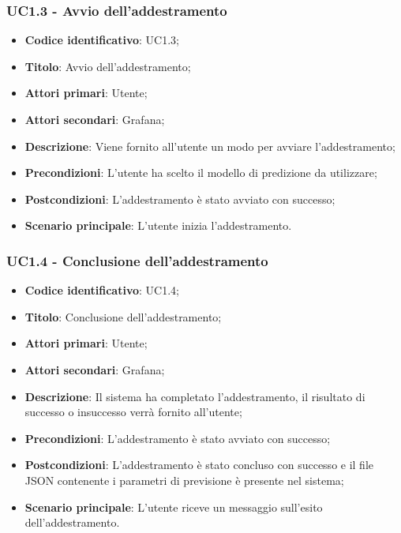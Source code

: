 \subsubsection{UC1.3 - Avvio dell'addestramento}
\begin{itemize}
	\item \textbf{Codice identificativo}: UC1.3;
	\item \textbf{Titolo}: Avvio dell'addestramento;
	\item \textbf{Attori primari}: Utente;
	\item \textbf{Attori secondari}: Grafana\glo;
	\item \textbf{Descrizione}: Viene fornito all'utente un modo per avviare l'addestramento;
	\item \textbf{Precondizioni}: L'utente ha scelto il modello di predizione da utilizzare;
	\item \textbf{Postcondizioni}: L'addestramento è stato avviato con successo;
	\item \textbf{Scenario principale}: L'utente inizia l'addestramento.
\end{itemize}

\subsubsection{UC1.4 - Conclusione dell'addestramento}
\begin{itemize}
	\item \textbf{Codice identificativo}: UC1.4;
	\item \textbf{Titolo}: Conclusione dell'addestramento;
	\item \textbf{Attori primari}: Utente;
	\item \textbf{Attori secondari}: Grafana\glo;
	\item \textbf{Descrizione}: Il sistema ha completato l'addestramento, il risultato di successo o insuccesso verrà fornito all'utente;
	\item \textbf{Precondizioni}: L'addestramento è stato avviato con successo;
	\item \textbf{Postcondizioni}: L'addestramento è stato concluso con successo e il file JSON contenente i parametri di previsione è presente nel sistema;
	\item \textbf{Scenario principale}: L'utente riceve un messaggio sull'esito dell'addestramento.
\end{itemize}

